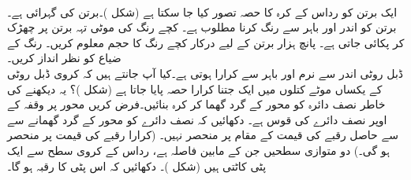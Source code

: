\\
ایک برتن کو رداس  کے کرہ کا حصہ تصور کیا جا سکتا ہے (شکل )۔برتن کی گہرائی  ہے۔برتن کو اندر اور باہر سے رنگ کرنا مطلوب ہے۔ کچے رنگ کی  موٹی تہہ برتن پر چھڑک کر پکائی جاتی ہے۔ پانچ ہزار برتن کے لیے درکار کچے رنگ کا حجم معلوم کریں۔ رنگ کے ضیاع کو نظر انداز کریں۔
\\
ڈبل روٹی اندر سے نرم اور باہر سے کرارا ہوتی ہے۔کیا آپ جانتے ہیں کہ کروی ڈبل روٹی کے یکساں  موٹے کتلوں میں  ایک جتنا کرارا حصہ پایا جاتا ہے (شکل )؟ یہ دیکھنے کی خاطر نصف دائرہ  کو محور  کے گرد گھما کر کرہ بنائیں۔فرض کریں محور  پر وقفہ  کے اوپر نصف دائرے کی قوس  ہے۔ دکھائیں کہ نصف دائرے کو محور  کے گرد گھمانے سے  سے حاصل رقبے کی قیمت  کے مقام پر منحصر نہیں۔ (کرارا رقبے  کی قیمت  پر منحصر ہو گی۔)
دو متوازی سطحیں جن کے مابین فاصلہ  ہے،  رداس  کے کروی سطح سے ایک پٹی کاٹتی ہیں (شکل )۔ دکھائیں کہ اس پٹی کا رقبہ  ہو گا۔   

